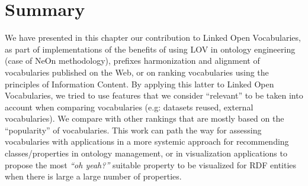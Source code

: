 \begin{figure}
\end{figure}

\section{Summary}
\label{ch6:conclusion}
We have presented in this chapter our contribution to Linked Open Vocabularies, as part of implementations of the benefits of using LOV in ontology engineering (case of NeOn methodology), prefixes harmonization and alignment of vocabularies published on the Web, or on ranking vocabularies using the principles of Information Content. By applying this latter to Linked Open Vocabularies, we tried to use features that we consider ``relevant'' to be taken into account when comparing vocabularies (e.g: datasets reused, external vocabularies). We compare with other rankings that are mostly based on the ``popularity'' of vocabularies. This work can path the way for assessing vocabularies with applications in a more systemic approach for recommending classes/properties in ontology management, or in visualization applications to propose the most \textit{``oh yeah?''} suitable property to be visualized for RDF entities when there is large a large number of properties.
